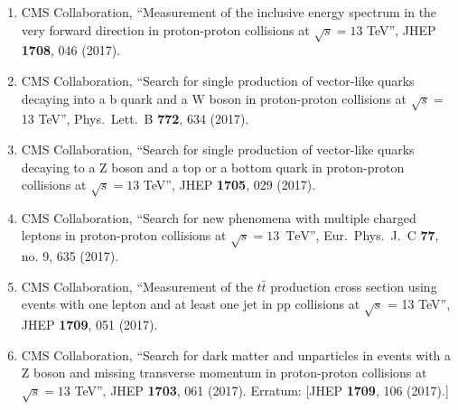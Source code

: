\begin{itemize}
\begin{enumerate}
\item CMS Collaboration, ``Measurement of the inclusive energy spectrum in the very forward direction in proton-proton collisions at $ \sqrt{s}=13 $ TeV'', JHEP {\bf 1708}, 046 (2017).

\item CMS Collaboration, ``Search for single production of vector-like quarks decaying into a b quark and a W boson in proton-proton collisions at $\sqrt s =$ 13 TeV'', Phys.\ Lett.\ B {\bf 772}, 634 (2017).

\item CMS Collaboration, ``Search for single production of vector-like quarks decaying to a Z boson and a top or a bottom quark in proton-proton collisions at $ \sqrt{s}=13 $ TeV'', JHEP {\bf 1705}, 029 (2017).

\item CMS Collaboration, ``Search for new phenomena with multiple charged leptons in proton-proton collisions at $\sqrt{s}= 13$ $\,\text {TeV}$'', Eur.\ Phys.\ J.\ C {\bf 77}, no. 9, 635 (2017).

\item CMS Collaboration, ``Measurement of the $t \bar t$ production cross section using events with one lepton and at least one jet in pp collisions at $\sqrt{s}$  = 13 TeV'', JHEP {\bf 1709}, 051 (2017).

\item CMS Collaboration, ``Search for dark matter and unparticles in events with a Z boson and missing transverse momentum in proton-proton collisions at $ \sqrt{s}=13 $ TeV'', JHEP {\bf 1703}, 061 (2017).
  Erratum: [JHEP {\bf 1709}, 106 (2017).]


\end{enumerate}
\end{itemize}
